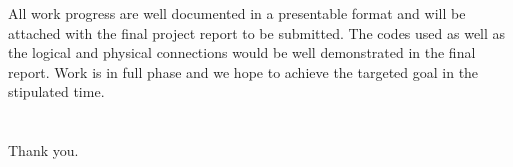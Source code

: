\documentclass[paper=a4, fontsize=11pt]{scrartcl}
\numberwithin{equation}{section}		%
\numberwithin{figure}{section}			%
\numberwithin{table}{section}				%
\begin{document}
\begin{paragraph}
	All work progress are well documented in a presentable format and will be attached with the final project report to be submitted. The codes used as well as the logical and physical connections would be well demonstrated in the final report. Work is in full phase and we hope to achieve the targeted goal in the stipulated time.\\\\\\
    
    Thank you.
\end{paragraph}


\end{document}
